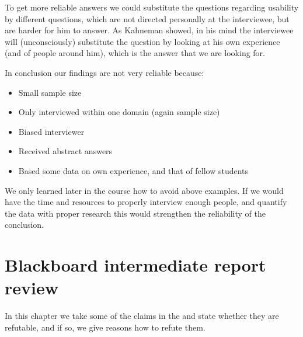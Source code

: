 To get more reliable answers we could substitute the questions regarding usability by different questions, which are not directed personally at the interviewee, but are harder for him to answer. As Kahneman showed, in his mind the interviewee will (unconsciously) substitute the question by looking at his own experience (and of people around him), which is the answer that we are looking for.

In conclusion our findings are not very reliable because:
\begin{itemize}
	\item Small sample size
	\item Only interviewed within one domain (again sample size)
	\item Biased interviewer
	\item Received abstract answers
	\item Based some data on own experience, and that of fellow students
\end{itemize}
We only learned later in the course how to avoid above examples. If we would have the time and resources to properly interview enough people, and quantify the data with proper research this would strengthen the reliability of the conclusion.

\chapter{Blackboard intermediate report review}
In this chapter we take some of the claims in the \rreport{} and state whether they are refutable, and if so, we give reasons how to refute them.

